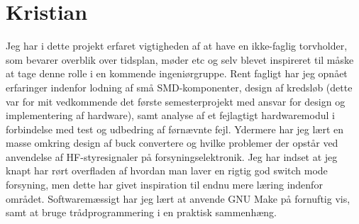 \section{Kristian}

Jeg har i dette projekt erfaret vigtigheden af at have en ikke-faglig torvholder, som bevarer overblik over tidsplan, møder etc og selv blevet inspireret til måske at tage denne rolle i en kommende ingeniørgruppe.
Rent fagligt har jeg opnået erfaringer indenfor lodning af små SMD-komponenter, design af kredsløb (dette var for mit vedkommende det første semesterprojekt med ansvar for design og implementering af hardware), samt analyse af et fejlagtigt hardwaremodul i forbindelse med test og udbedring af førnævnte fejl.
Ydermere har jeg lært en masse omkring design af buck convertere og hvilke problemer der opstår ved anvendelse af HF-styresignaler på forsyningselektronik.
Jeg har indset at jeg knapt har rørt overfladen af hvordan man laver en rigtig god switch mode forsyning, men dette har givet inspiration til endnu mere læring indenfor området.
Softwaremæssigt har jeg lært at anvende GNU Make på fornuftig vis, samt at bruge trådprogrammering i en praktisk sammenhæng.